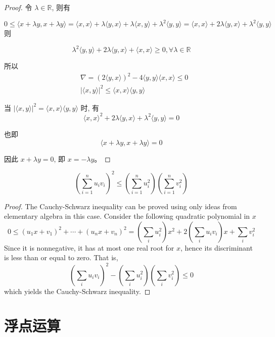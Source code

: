 \begin{proof}
    令 $\lambda \in \mathbb{R}$, 则有 
    
    $$0 \leq\langle x+\lambda y, x+\lambda y\rangle=\langle x, x\rangle+\lambda\langle y, x\rangle+\lambda\langle x, y\rangle+\lambda^{2}\langle y, y\rangle=\langle x, x\rangle+2 \lambda\langle y, x\rangle+\lambda^{2}\langle y, y\rangle$$
则 

$$\lambda^{2}\langle y, y\rangle+2 \lambda\langle y, x\rangle+\langle x, x\rangle \geq 0, \forall \lambda \in \mathbb{R}$$

所以
$$
\begin{aligned}
&\nabla=(2\langle y, x\rangle)^{2}-4\langle y, y\rangle\langle x, x\rangle \leq 0 \\
&|\langle x, y\rangle|^{2} \leq\langle x, x\rangle\langle y, y\rangle
\end{aligned}
$$

当 $|\langle x, y\rangle|^{2}=\langle x, x\rangle\langle y, y\rangle$ 时, 有 $$\langle x, x\rangle^{2}+2 \lambda\langle y, x\rangle+\lambda^{2}\langle y, y\rangle=0$$

也即 $$\langle x+\lambda y, x+\lambda y\rangle=0$$

因此 $x+\lambda y=0$, 即 $x=-\lambda y$。
\end{proof}

\begin{theorem}
    $$\left(\sum_{i=1}^{n} u_{i} v_{i}\right)^{2} \leq\left(\sum_{i=1}^{n} u_{i}^{2}\right)\left(\sum_{i=1}^{n} v_{i}^{2}\right)$$
\end{theorem}

\begin{proof}
    The Cauchy-Schwarz inequality can be proved using only ideas from elementary algebra in this case. Consider the following quadratic polynomial in $x$
$$
0 \leq\left(u_{1} x+v_{1}\right)^{2}+\cdots+\left(u_{n} x+v_{n}\right)^{2}=\left(\sum_{i} u_{i}^{2}\right) x^{2}+2\left(\sum_{i} u_{i} v_{i}\right) x+\sum_{i} v_{i}^{2}
$$
Since it is nonnegative, it has at most one real root for $x$, hence its discriminant is less than or equal to zero. That is,
$$
\left(\sum_{i} u_{i} v_{i}\right)^{2}-\left(\sum_{i} u_{i}^{2}\right)\left(\sum_{i} v_{i}^{2}\right) \leq 0
$$
which yields the Cauchy-Schwarz inequality.
\end{proof}

\section{浮点运算}

